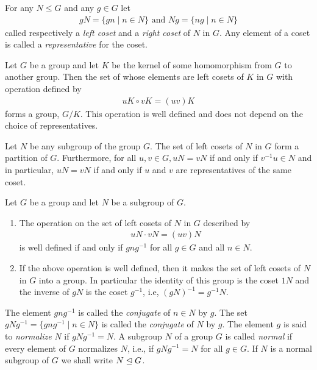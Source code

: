 \documentclass[../main]{subfiles}
\begin{document}
 
 \begin{dfn}
  For any $N\leq G$ and any $g\in G$ let 
  \begin{align*}
   gN=\{gn \mid n\in N\} \text{ and } Ng=\{ng \mid n\in N\}
   \end{align*}
  called respectively a \textit{left coset} and a \textit{right coset} of $N$ in $G$. Any element of a coset is called a \textit{representative} for the coset.
 \end{dfn}
 
 
 \begin{thm}
  Let $G$ be a group and let $K$ be the kernel of some homomorphism from $G$ to another group. Then the set of whose elements are left cosets of $K$ in $G$ with operation defined by 
  \begin{align*}
   uK\circ vK = (uv)K
  \end{align*}
  forms a group, $G/K$. This operation is well defined and does not depend on the choice of representatives. 
 \end{thm}
 
 
 \begin{prop}
  Let $N$ be any subgroup of the group $G$. The set of left cosets of $N$ in $G$ form a partition of $G$. Furthermore, for all $u,v\in G, uN=vN$ if and only if $v^{-1}u\in N$ and in particular, $uN = vN$ if and only if $u$ and $v$ are representatives of the same coset.
  \end{prop}
  
  
  \begin{prop}
   Let $G$ be a group and let $N$ be a subgroup of $G$. 
   \begin{enumerate}
    \item The operation on the set of left cosets of $N$ in $G$ described by
    \begin{align*}
     uN\cdot vN =(uv)N
    \end{align*}
    is well defined if and only if $gng^{-1}$ for all $g\in G$ and all $n\in N $. 
    \item If the above operation is well defined, then it makes the set of left cosets of $N$ in $G$ into a group. In particular the identity of this group is the coset $1N$ and the inverse of $gN$ is the coset $g^{-1}$, i.e, $(gN)^{-1} = g^{-1}N$.
   \end{enumerate}
  \end{prop}
  
  
  
  \begin{dfn}
   The element $gng^{-1}$ is called the \textit{conjugate} of $n\in N$ by $g$. The set $gNg^{-1}=\{gng^{-1}\mid n\in N\}$ is called the \textit{conjugate} of $N$ by $g$. The element $g$ is said to \textit{normalize} $N$ if $gNg^{-1} = N$. A subgroup $N$ of a group $G$ is called \textit{normal} if every element of $G$ normalizes $N$, i.e., if $gNg^{-1} = N$ for all $g\in G$. If $N$ is a normal subgroup of $G$ we shall write $N \trianglelefteq G$. 
  \end{dfn}
  
\end{document}
